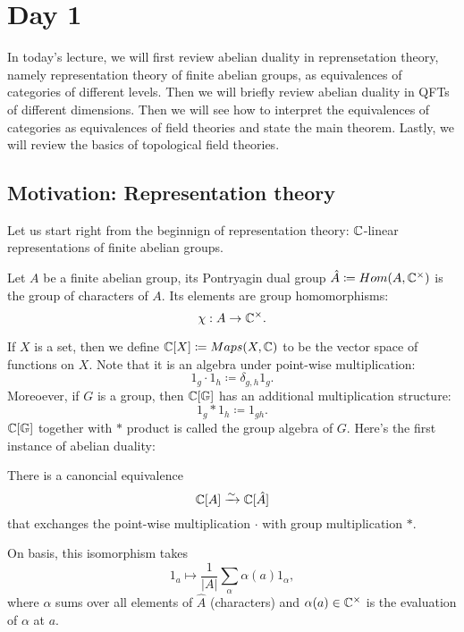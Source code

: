 \documentclass[./main]{subfiles}
\begin{document}
\section{Day 1}
In today's lecture, we will first review abelian duality in reprensetation theory, 
namely representation theory of finite abelian groups, as equivalences of categories of different levels. Then we will briefly review 
abelian duality in QFTs of different dimensions. 
Then we will see how to interpret the equivalences of categories as equivalences of field theories and state the main theorem.
Lastly, we will review the basics of topological field theories.


\subsection{Motivation: Representation theory}
Let us start right from the beginnign of representation theory:
$\mathbb{C}$-linear representations of finite abelian groups. 

Let $A$ be a finite abelian group, its Pontryagin dual group $\hat{A} \coloneqq Hom(A, \mathbb{C}^\times)$
is the group of characters of $A$. Its elements are group homomorphisms:
\begin{equation}
\chi : A \rightarrow \mathbb{C}^\times.
\end{equation}

If $X$ is a set, then we define $\mathbb{C}[X] \coloneqq Maps(X, \mathbb{C})$ to be the 
vector space of functions on $X$. Note that it is an algebra under point-wise multiplication:
\begin{equation}
    1_g \cdot 1_h \coloneqq \delta_{g,h} 1_g.
\end{equation}
Moreoever, if $G$ is a group, then $\mathbb{C[G]}$ has an additional multiplication structure:
\begin{equation}
    1_g  \ast 1_h \coloneqq 1_{gh}.
\end{equation}
$\mathbb{C[G]}$ together with $\ast$ product is called the group algebra of $G$.
Here's the first instance of abelian duality:
\begin{theorem}
There is a canoncial equivalence 
\begin{equation}
    \mathbb{C}[A] \xrightarrow{\sim} \mathbb{C}[\hat{A}]
\end{equation}
that exchanges the point-wise multiplication $\cdot$ with group multiplication $\ast$.
\end{theorem}
On basis, this isomorphism takes 
\begin{equation}
    1_a \mapsto  \frac{1}{|A|}\sum_{\alpha} \alpha(a) 1_\alpha,
\end{equation}
where $\alpha$ sums over all elements of $\hat{A}$ (characters) and $\alpha(a) \in  \mathbb{C}^\times$ is the
evaluation of $\alpha$ at $a$. 
\end{document}
